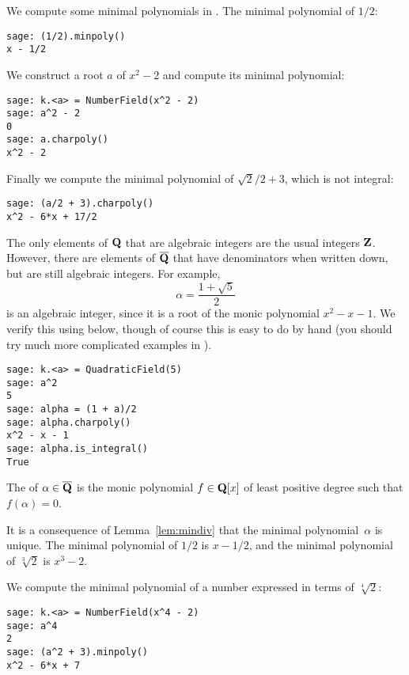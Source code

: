 \begin{example}
We compute some minimal polynomials in \sage.
The minimal polynomial of $1/2$:
\begin{verbatim}
sage: (1/2).minpoly()
x - 1/2
\end{verbatim}
We construct a root $a$ of $x^2-2$ and compute its minimal polynomial:
\begin{verbatim}
sage: k.<a> = NumberField(x^2 - 2)
sage: a^2 - 2
0
sage: a.charpoly()
x^2 - 2
\end{verbatim}%
Finally we compute the minimal polynomial of $\sqrt{2}/2 + 3$, which
is not integral:
\begin{verbatim}
sage: (a/2 + 3).charpoly()
x^2 - 6*x + 17/2
\end{verbatim}
\end{example}

The only elements of $\mathbf{Q}$ that are algebraic integers are the usual
integers $\mathbf{Z}$.  However, there are elements of $\overline{\mathbf{Q}}$ that have
denominators when written down, but are still algebraic integers.  For example,
$$
  \alpha = \frac{1+\sqrt{5}}{2}
$$
is an algebraic integer, since it is a root of the monic 
polynomial $x^2 - x - 1$.  We verify this using \sage below,
though of course this is easy to do by hand (you should try
much more complicated examples in \sage).
\begin{verbatim}
sage: k.<a> = QuadraticField(5)
sage: a^2
5
sage: alpha = (1 + a)/2
sage: alpha.charpoly()
x^2 - x - 1
sage: alpha.is_integral()
True
\end{verbatim}

\begin{definition}
The  of $\alpha\in\overline{\mathbf{Q}}$ is the monic polynomial
$f\in\mathbf{Q}[x]$ of least positive degree such that $f(\alpha)=0$.
\end{definition}
It is a consequence of Lemma~\ref{lem:mindiv} that
the minimal polynomial~$\alpha$ is unique.
The minimal polynomial of $1/2$ is $x-1/2$, and
the minimal polynomial of $\sqrt[3]{2}$ is $x^3-2$.

\begin{example}
We compute the minimal polynomial of a number expressed
in terms of $\sqrt[4]{2}$:
\begin{verbatim}
sage: k.<a> = NumberField(x^4 - 2)
sage: a^4
2
sage: (a^2 + 3).minpoly()
x^2 - 6*x + 7
\end{verbatim}

\end{example}

